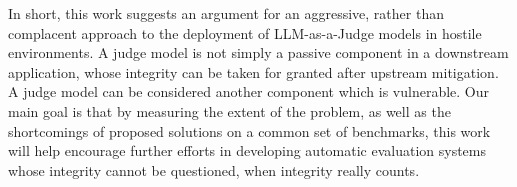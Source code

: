 In short, this work suggests an argument for an aggressive, rather than complacent approach to the deployment of LLM-as-a-Judge models in hostile environments. A judge model is not simply a passive component in a downstream application, whose integrity can be taken for granted after upstream mitigation. A judge model can be considered another component which is vulnerable. Our main goal is that by measuring the extent of the problem, as well as the shortcomings of proposed solutions on a common set of benchmarks, this work will help encourage further efforts in developing automatic evaluation systems whose integrity cannot be questioned, when integrity really counts.
